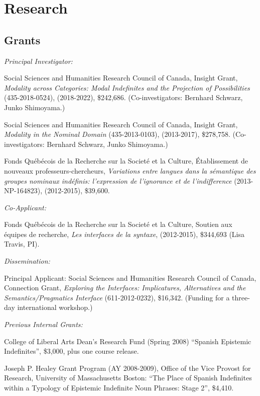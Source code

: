 \documentclass[11pt]{article}
\begin{document}
\section*{Research}

\subsection*{Grants}

\textit{Principal Investigator:}

 Social Sciences and Humanities Research
Council of Canada, Insight Grant, \textit{Modality across Categories: Modal Indefinites and the Projection of Possibilities} (435-2018-0524), (2018-2022), \$242,686. (Co-investigators:
Bernhard Schwarz, Junko Shimoyama.)

 Social Sciences and Humanities Research
Council of Canada, Insight Grant, \textit{Modality in the Nominal
  Domain} (435-2013-0103), (2013-2017), \$278,758. (Co-investigators:
Bernhard Schwarz, Junko Shimoyama.)

Fonds Qu\'eb\'ecois de la Recherche sur la
Societ\'e et la Culture, \'Etablissement de
nouveaux professeurs-chercheurs, \textit{Variations
  entre langues dans la s\'emantique des groupes nominaux ind\'efinis:
  l'expression de l'ignorance et de l'indifference} (2013-NP-164823),
(2012-2015), \$39,600.


\textit{Co-Applicant:} 

Fonds Qu\'eb\'ecois de la Recherche sur la
Societ\'e et la Culture, Soutien aux \'equipes de recherche,
\textit{Les interfaces de la syntaxe}, (2012-2015), \$344,693 (Lisa
Travis, PI).

\textit{Dissemination:}

Principal Applicant: Social Sciences and Humanities Research Council
of Canada, Connection Grant, \textit{Exploring the Interfaces:
  Implicatures, Alternatives and the Semantics/Pragmatics Interface}
(611-2012-0232), \$16,342. (Funding for a three-day international workshop.)



\textit{Previous Internal Grants:}

College of Liberal Arts Dean's Research Fund (Spring 2008) ``Spanish Epistemic Indefinites'', \$3,000, plus one course release.

Joseph P. Healey Grant Program (AY 2008-2009), Office of the
  Vice Provost for Research, University of Massachusetts Boston: ``The
  Place of Spanish Indefinites within a Typology of Epistemic
  Indefinite Noun Phrases: Stage 2'', \$4,410.
\end{document}
